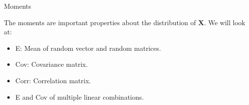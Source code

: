 \documentclass[ignorenonframetext,]{beamer}
\providecommand{\tightlist}{%
  \setlength{\itemsep}{0pt}\setlength{\parskip}{0pt}}
\begin{document}
\begin{frame}

\begin{block}{Moments}

\vspace{2mm}

The moments are important properties about the distribution of
\(\boldsymbol{X}\). We will look at:

\begin{itemize}
\tightlist
\item
  E: Mean of random vector and random matrices.
\item
  Cov: Covariance matrix.
\item
  Corr: Correlation matrix.
\item
  E and Cov of multiple linear combinations.
\end{itemize}

\end{block}

\end{frame}
\end{document}
